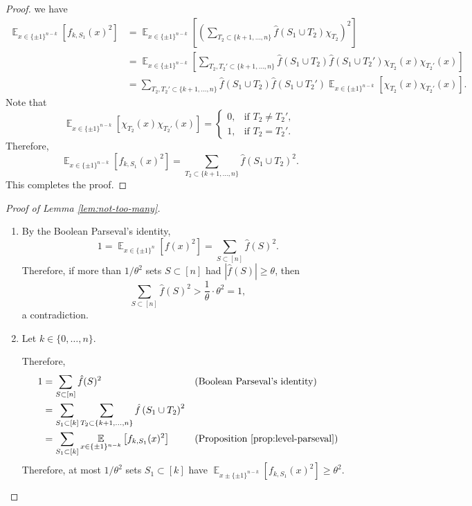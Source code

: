 \documentclass[letterpaper, reqno,11pt]{article}
\newcommand{\EE}{\mathop{{}\mathbb{E}}}
\begin{document}
\begin{proof}
  we have
  \begin{align*}
    \EE_{x \in \{ \pm 1 \}^{n - k}} \left[f_{k, S_1}(x)^2\right] &= \EE_{x \in \{ \pm 1 \}^{n - k}}\left[\left(\sum_{T_2 \subset \{ k + 1, \ldots, n \}} \hat{f}\left(S_1 \cup T_2\right) \chi_{T_2}\right)^2\right] \\
    &= \EE_{x \in \{ \pm 1 \}^{n - k}}\left[\sum_{T_2, T_2' \subset \{ k + 1, \ldots, n \}} \hat{f}\left(S_1 \cup T_2\right) \hat{f}\left(S_1 \cup T_2'\right) \chi_{T_2}(x) \chi_{T_2'}(x)\right] \\
    &= \sum_{T_2, T_2' \subset \{ k + 1, \ldots, n \}} \hat{f}\left(S_1 \cup T_2\right) \hat{f}\left(S_1 \cup T_2'\right) \EE_{x \in \{ \pm 1 \}^{n - k}}\left[\chi_{T_2}(x) \chi_{T_2'}(x)\right].
  \end{align*}
  Note that
  $$ \EE_{x \in \{ \pm 1 \}^{n - k}}\left[\chi_{T_2}(x) \chi_{T_2'}(x)\right] = \left\{
    \begin{array}{ll}
      0, & \text{if $T_2 \neq T_2'$}, \\
      1, & \text{if $T_2 = T_2'$}.
    \end{array}
  \right. $$
  Therefore,
  $$ \EE_{x \in \{ \pm 1 \}^{n - k}} \left[f_{k, S_1}(x)^2\right] = \sum_{T_2 \subset \{ k + 1, \ldots, n \}} \hat{f}\left(S_1 \cup T_2\right)^2. $$
  This completes the proof.
\end{proof}

\begin{proof}[Proof of Lemma \ref{lem:not-too-many}]
  \begin{enumerate}[label=(\roman*)]
    \item By the Boolean Parseval's identity,
    $$ 1 = \EE_{x \in \{ \pm 1 \}^n}\left[f(x)^2\right] = \sum_{S \subset [n]} \hat{f}(S)^2. $$
    Therefore, if more than $1/\theta^2$ sets $S \subset [n]$ had $|\hat{f}(S)| \geq \theta$, then
    $$ \sum_{S \subset [n]} \hat{f}(S)^2 > \frac{1}{\theta} \cdot \theta^2 = 1, $$
    a contradiction.
    \item Let $k \in \{ 0, \ldots, n \}$. 

    Therefore,
    \begin{align*}
      1 &= \sum_{S \subset [n]} \hat{f}(S)^2 && \text{(Boolean Parseval's identity)} \\
      &= \sum_{S_1 \subset [k]} \sum_{T_2 \subset \{ k + 1, \ldots, n \}} \hat{f}\left(S_1 \cup T_2\right)^2 \\
      &= \sum_{S_1 \subset [k]} \EE_{x \in \{ \pm 1 \}^{n - k}}\left[f_{k, S_1}(x)^2\right] && \text{(Proposition \ref{prop:level-parseval})}
    \end{align*}
    Therefore, at most $1/\theta^2$ sets $S_1 \subset [k]$ have $\EE_{x \pm \{ \pm 1 \}^{n - k}}[f_{k, S_1}(x)^2] \geq \theta^2$.
  \end{enumerate}
\end{proof}
\end{document}
